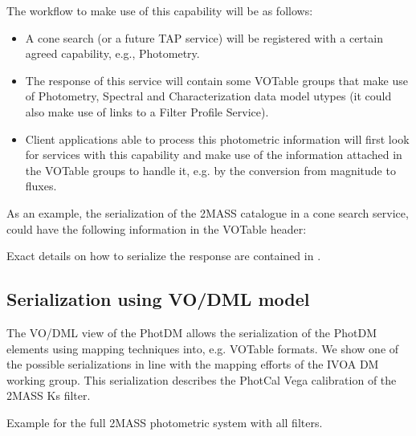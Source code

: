 \documentclass[11pt,a4paper]{ivoa}
\begin{document}
\begin{appendices}
The workflow to make use of this capability will be as follows:
\par

\begin{itemize}
	\item{A cone search (or a future TAP service) will be registered with a 
	certain agreed capability, e.g., Photometry.\par}

	\item{The response of this service will contain some VOTable groups that 
	make use of Photometry, Spectral and Characterization data model utypes 
	(it could also make use of links to a Filter Profile Service).\par}

	\item{Client applications able to process this photometric information 
	will first look for services with this capability and make use of the 
	information attached in the VOTable groups to handle it, e.g. by the 
	conversion from magnitude to fluxes.}
\end{itemize}\par

As an example, the serialization of the 2MASS catalogue in a cone search service, 
could have the following information in the VOTable header:
\par


Exact details on how to serialize the response are contained in \citep{derriere}.

\subsection{Serialization using VO/DML model} \label{appendixmapping}
The VO/DML view of the PhotDM allows the serialization of the PhotDM elements
using mapping techniques into, e.g. VOTable formats. We show one of the possible 
serializations in line with the mapping efforts of the IVOA DM working group. 
This serialization describes the PhotCal Vega calibration of the 2MASS Ks filter.
\par 



 Example for the full 2MASS photometric system with all filters.
 


\end{appendices}


\end{document}
